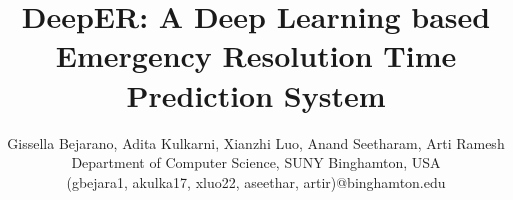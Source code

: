 \documentclass{IEEEtran}
\begin{document}
\title{DeepER: A Deep Learning based Emergency Resolution Time Prediction System}
\author{ Gissella Bejarano, Adita Kulkarni, Xianzhi Luo, Anand Seetharam, Arti Ramesh
\\ Department of Computer Science, SUNY Binghamton, USA
\\  (gbejara1,  akulka17, xluo22, aseethar, artir)@binghamton.edu
}
%
%
%
%



\maketitle
\end{document}
